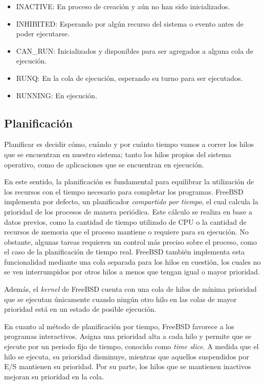 \begin{itemize}
    \item \uppercase{inactive}: En proceso de creación y aún no han sido inicializados.
    \item \uppercase{inhibited}: Esperando por algún recurso del sistema o evento antes de poder ejecutarse.
    \item \uppercase{can\_run}: Inicializados y disponibles para ser agregados a alguna cola de ejecución.
    \item \uppercase{runq}: En la cola de ejecución, esperando su turno para ser ejecutados.
    \item \uppercase{running}: En ejecución.
\end{itemize}

\subsection{Planificación}

Planificar es decidir cómo, cuándo y por cuánto tiempo vamos a correr los hilos que se encuentran en nuestro sistema; tanto los hilos propios del sistema operativo, como de aplicaciones que se encuentran en ejecución.\par

En este sentido, la planificación es fundamental para equilibrar la utilización de los recursos con el tiempo necesario para completar los programas. FreeBSD implementa por defecto, un planificador \textit{compartido por tiempo}, el cual calcula la prioridad de los procesos de manera periódica. Este cálculo se realiza en base a datos previos, como la cantidad de tiempo utilizado de CPU o la cantidad de recursos de memoria que el proceso mantiene o requiere para su ejecución. No obstante, algunas tareas requieren un control más preciso sobre el proceso, como el caso de la planificación de tiempo real. FreeBSD también implementa esta funcionalidad mediante una cola separada para los hilos en cuestión, los cuales no se ven interrumpidos por otros hilos a menos que tengan igual o mayor prioridad.\par

Además, el \textit{kernel} de FreeBSD cuenta con una cola de hilos de mínima prioridad que se ejecutan únicamente cuando ningún otro hilo en las colas de mayor prioridad está en un estado de posible ejecución.\par

En cuanto al método de planificación por tiempo, FreeBSD favorece a los programas interactivos. Asigna una prioridad alta a cada hilo y permite que se ejecute por un periodo fijo de tiempo, conocido como \textit{time slice}. A medida que el hilo se ejecuta, su prioridad disminuye, mientras que aquellos suspendidos por E/S mantienen su prioridad. Por su parte, los hilos que se mantienen inactivos mejoran su prioridad en la cola.\par

